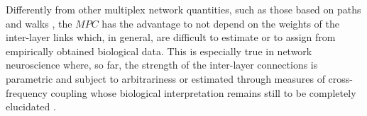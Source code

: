 Differently from other multiplex network quantities, such as those based on paths and walks \citep{boccaletti_structure_2014}, the $MPC$ has the advantage to not depend on the weights of the inter-layer links which, in general, are difficult to estimate or to assign from empirically obtained biological data. This is especially true in network neuroscience where, so far, the strength of the inter-layer connections is parametric and subject to arbitrariness \citep{de_domenico_mapping_2016} or estimated through measures of cross-frequency coupling \citep{brookes_multi-layer_2016-1} whose biological interpretation remains still to be completely elucidated \citep{jirsa_cross-frequency_2013}.
